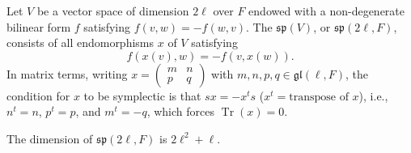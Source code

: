 Let $V$ be a vector space of dimension $2\ell$ over $F$ endowed with a non-degenerate bilinear form $f$ satisfying $f(v, w) = -f(w, v)$. The  $\mathfrak{sp}(V)$, or $\mathfrak{sp}(2\ell, F)$, consists of all endomorphisms $x$ of $V$ satisfying
$$f(x(v), w) = -f(v, x(w)).$$
In matrix terms, writing $x = \begin{pmatrix} m & n \\ p & q \end{pmatrix}$ with $m, n, p, q \in \mathfrak{gl}(\ell, F)$, the condition for $x$ to be symplectic is that $sx = -x^t s$ ($x^t = \text{transpose of } x$), i.e., $n^t = n$, $p^t = p$, and $m^t = -q$, which forces $\operatorname{Tr}(x) = 0$.

The dimension of $\mathfrak{sp}(2\ell, F)$ is $2\ell^2 + \ell$.
